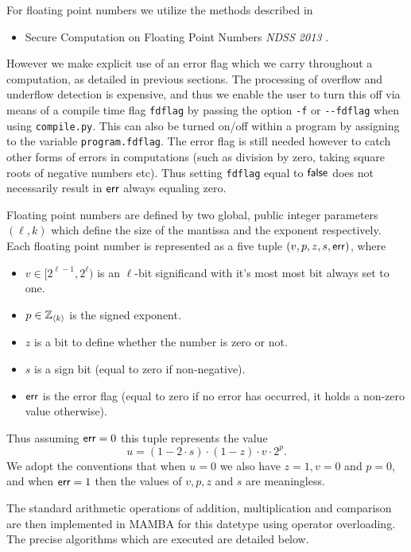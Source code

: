 
For floating point numbers we utilize the methods described in
\begin{itemize}
\item Secure Computation on Floating Point Numbers {\em NDSS 2013} \cite{ABZS13}.
\end{itemize}
However we make explicit use of an error flag which we carry throughout
a computation, as detailed in previous sections.
The processing of overflow and underflow detection is expensive,
and thus we enable the user to turn this off via
means of a compile time flag \verb+fdflag+ by passing the option 
\verb+-f+ or \verb+--fdflag+ when using \verb|compile.py|.
This can also be turned on/off within a program by assigning
to the variable \verb+program.fdflag+.
The error flag is still needed however to catch other forms of errors
in computations (such as division by zero, taking square roots of
negative numbers etc). 
Thus setting \verb+fdflag+ equal to ${\mathsf{false}}$
does not necessarily result in $\mathsf{err}$ always equaling zero.

Floating point numbers are defined by two global, public integer parameters
$(\ell,k)$ which define the size of the mantissa and the exponent respectively.
Each floating point number is represented as a five tuple $(v,p,z,s,\mathsf{err})$, where
\begin{itemize}
\item $v \in [2^{\ell-1},2^\ell)$ is an $\ell$-bit significand with it's most
most bit always set to one.
\item $p \in {\mathbb{Z}}_{\langle k \rangle}$ is the signed exponent.
\item $z$ is a bit to define whether the number is zero or not.
\item $s$ is a sign bit (equal to zero if non-negative).
\item $\mathsf{err}$ is the error flag (equal to zero if no error has occurred, it holds a non-zero value otherwise).
\end{itemize}
Thus assuming $\mathsf{err}=0$ this tuple represents the value
\[ u=(1- 2 \cdot s) \cdot (1-z) \cdot v \cdot 2^p. \]
We adopt the conventions that when $u=0$ we also have $z=1, v=0$ and $p=0$,
and when $\mathsf{err}=1$ then the values of $v,p,z$ and $s$ are meaningless.

The standard arithmetic operations of addition, multiplication and
comparison are then implemented in MAMBA for this datetype using
operator overloading. The precise algorithms which are executed
are detailed below.

